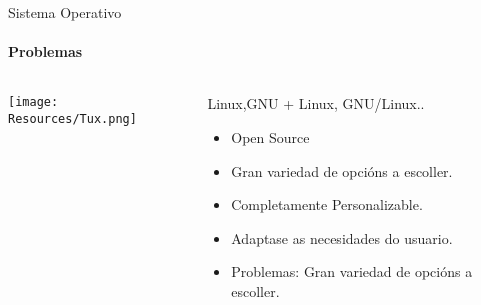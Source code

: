 \documentclass{beamer}
\begin{document}
\begin{frame}{Sistema Operativo}
  \framesubtitle{Problemas}


  \begin{columns}
    \begin{column}{0.5\textwidth}
      \texttt{[image: Resources/Tux.png]}

      \vspace{1cm}


    \end{column}

    \begin{column}{0.4\textwidth}
      \begin{block}{Linux,GNU + Linux, GNU/Linux..}
        \begin{itemize}
          \item Open Source
          \item Gran variedad de opcións a escoller.
          \item Completamente Personalizable.
          \item Adaptase as necesidades do usuario.
          \item Problemas: Gran variedad de opcións a escoller.
        \end{itemize}
      \end{block}

    \end{column}

  \end{columns}

\end{frame}


\end{document}
